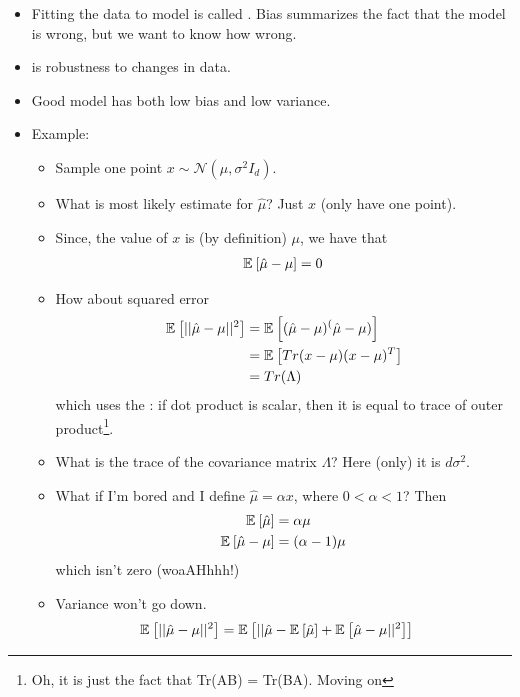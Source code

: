 \documentclass[12pt]{article}
\begin{document}
\begin{itemize}
	\item Fitting the data to model is called . Bias summarizes the fact that the model is wrong, but we want to know how wrong. 
	\item {} is robustness to changes in data. 
	\item Good model has both low bias and low variance. 
	\item Example:
	\begin{itemize}
		\item Sample one point $x \sim \mathcal{N} (\mu, \sigma^2 I_d)$. 
		\item What is most likely estimate for $\hat{\mu}$? Just $x$ (only have one point). 
		\item Since, the  value of $x$ is (by definition) $\mu$, we have that
		\begin{align}
			\mathbb{E}_{}\left[\hat{\mu} - \mu\right] = 0
		\end{align}
		\item How about squared error
		\begin{align}
			\mathbb{E}_{}\left[||\hat{\mu} - \mu ||^2\right] &= \mathbb{E}_{}\left[(\hat{\mu} - \mu )^(\hat{\mu} - \mu )\right] \\
			&= \mathbb{E}_{}\left[Tr(x-\mu)(x-\mu)^T\right] \\
			&= Tr(\Lambda)
		\end{align}
		which uses the \textbf{}: if dot product is scalar, then it is equal to trace of outer product\footnote{Oh, it is just the fact that Tr(AB) = Tr(BA). Moving on\textellipsis}. 
		\item What is the trace of the covariance matrix $\Lambda$? Here (only) it is $d\sigma^2$. 
		\item What if I'm bored and I define $\hat{\mu} = \alpha x$, where $0 < \alpha < 1$? Then
		\begin{align}
			\mathbb{E}_{}\left[\hat{\mu}\right] &= \alpha \mu \\
			\mathbb{E}_{}\left[\hat{\mu} - \mu\right] &= (\alpha - 1) \mu 
		\end{align}
		which isn't zero (woaAHhhh!)
		\item Variance won't go down. 
		\begin{align}
			\mathbb{E}_{}\left[||\hat{\mu} - \mu||^2\right] &= \mathbb{E}_{}\left[||\hat{\mu} - \mathbb{E}_{}\left[\hat{\mu}\right] + \mathbb{E}_{}\left[\hat{\mu} -  \mu||^2\right]\right] 
		\end{align}
	\end{itemize}
	

\end{itemize}
\end{document}
